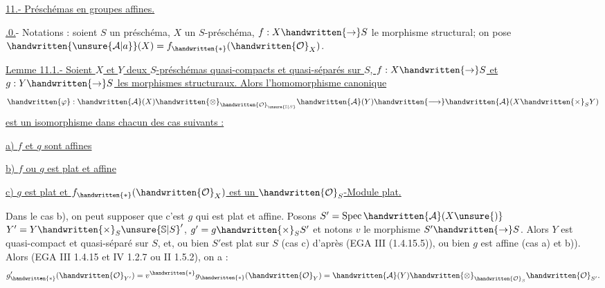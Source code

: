 \uline{11.- Préschémas en groupes affines.}

\uline{.0.}- Notations : soient $S$ un préschéma, $X$ un $S$-préschéma, $f:X\handwritten{\to}S$ le morphisme structural; on pose $\handwritten{\unsure{\mathcal{A}|a}}(X)=f_{\handwritten{*}}(\handwritten{\mathcal{O}}_X)$.

\uline{Lemme 11.1.- Soient $X$ et $Y$ deux $S$-préschémas quasi-compacts et quasi-séparés sur $S$, $f:X\handwritten{\to}S$ et $g:Y\handwritten{\to}S$ les morphismes structuraux. Alors l'homomorphisme canonique}
\[
\handwritten{\varphi}:\handwritten{\mathcal{A}}(X)\handwritten{\otimes}_{\handwritten{\mathcal{O}}_{\unsure{\mathbb{S}|S}}}\handwritten{\mathcal{A}}(Y)\handwritten{\longrightarrow}\handwritten{\mathcal{A}}(X\handwritten{\times}_S Y)
\]
\uline{est un isomorphisme dans chacun des cas suivants :}

\uline{a) $f$ et $g$ sont affines}

\uline{b) $f$ ou $g$ est plat et affine}

\uline{c) $g$ est plat et $f_{\handwritten{*}}(\handwritten{\mathcal{O}}_X)$ est un $\handwritten{\mathcal{O}}_S$-Module plat.}

Dans le cas b), on peut supposer que c'est $g$ qui est plat et affine. Posons $S'=\operatorname{Spec}\handwritten{\mathcal{A}}(X\unsure{)}$ $Y'=Y\handwritten{\times}_S\unsure{\mathbb{S}|S}'$, $g'=g\handwritten{\times}_S S'$ et notons $v$ le morphisme $S'\handwritten{\to}S$. Alors $Y$ est quasi-compact et quasi-séparé sur $S$, et, ou bien $S'$est plat sur $S$ (cas c) d'après (EGA III (1.4.15.5)), ou bien $g$ est affine (cas a) et b)). Alors (EGA III 1.4.15 et IV 1.2.7 ou II 1.5.2), on a :
\[
g'_{\handwritten{*}}(\handwritten{\mathcal{O}}_{Y'})=v^{\handwritten{*}}g_{\handwritten{*}}(\handwritten{\mathcal{O}}_Y)=\handwritten{\mathcal{A}}(Y)\handwritten{\otimes}_{\handwritten{\mathcal{O}}_S}\handwritten{\mathcal{O}}_{S'}.
\]

